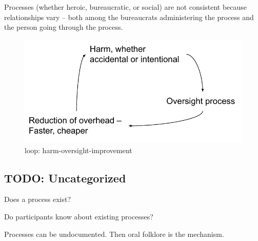Processes (whether heroic, bureaucratic, or social) are not consistent because relationships vary -- both among the bureaucrats administering the process and the person going through the process.






\begin{figure}
    \centering
    \includegraphics{images/process_loop_harm-oversight-improvement}
    \caption{loop: harm-oversight-improvement}
    \label{fig:harm-oversight-improvement}
\end{figure}








\subsection{TODO: Uncategorized}

Does a process exist?

Do participants know about existing processes?

Processes can be undocumented. Then oral folklore is the mechanism. 


